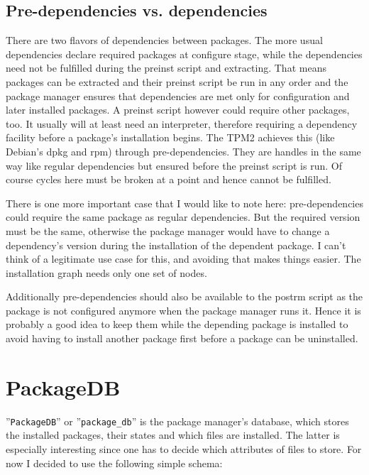 \documentclass[a4paper]{scrartcl}
\newcommand{\module}[1]{\texttt{#1}}
\begin{document}
	\subsection{Pre-dependencies vs. dependencies}
	\label{sec:pre_dependencies_vs_dependencies}
	
	There are two flavors of dependencies between packages. The more usual dependencies declare required packages at configure stage, while the dependencies need not be fulfilled during the preinst script and extracting. That means packages can be extracted and their preinst script be run in any order and the package manager ensures that dependencies are met only for configuration and later installed packages. A preinst script however could require other packages, too. It usually will at least need an interpreter, therefore requiring a dependency facility before a package's installation begins. The TPM2 achieves this (like Debian's dpkg and rpm) through pre-dependencies. They are handles in the same way like regular dependencies but ensured before the preinst script is run. Of course cycles here must be broken at a point and hence cannot be fulfilled.
	
	There is one more important case that I would like to note here: pre-dependencies could require the same package as regular dependencies. But the required version must be the same, otherwise the package manager would have to change a dependency's version during the installation of the dependent package. I can't think of a legitimate use case for this, and avoiding that makes things easier. The installation graph needs only one set of nodes.
	
	Additionally pre-dependencies should also be available to the postrm script as the package is not configured anymore when the package manager runs it. Hence it is probably a good idea to keep them while the depending package is installed to avoid having to install another package first before a package can be uninstalled.
	
	
	\section{PackageDB}
	\label{sec:packagedb}
	
	''\module{PackageDB}'' or ''\module{package\_db}'' is the package manager's database, which stores the installed packages, their states and which files are installed. The latter is especially interesting since one has to decide which attributes of files to store. For now I decided to use the following simple schema:
	
\end{document}
